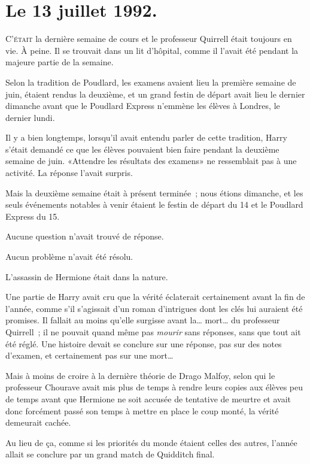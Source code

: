 
\section{Le 13 juillet 1992.}

\lettrine{C}{'était} la dernière semaine de cours et le professeur Quirrell était toujours en vie. À peine. Il se trouvait dans un lit d'hôpital, comme il l'avait été pendant la majeure partie de la semaine.

Selon la tradition de Poudlard, les examens avaient lieu la première semaine de juin, étaient rendus la deuxième, et un grand festin de départ avait lieu le dernier dimanche avant que le Poudlard Express n'emmène les élèves à Londres, le dernier lundi.

Il y a bien longtemps, lorsqu'il avait entendu parler de cette tradition, Harry s'était demandé ce que les élèves pouvaient bien faire pendant la deuxième semaine de juin. «Attendre les résultats des examens» ne ressemblait pas à une activité. La réponse l'avait surpris.

Mais la deuxième semaine était à présent terminée~; nous étions dimanche, et les seuls événements notables à venir étaient le festin de départ du 14 et le Poudlard Express du 15.

Aucune question n'avait trouvé de réponse.

Aucun problème n'avait été résolu.

L'assassin de Hermione était dans la nature.

Une partie de Harry avait cru que la vérité éclaterait certainement avant la fin de l'année, comme s'il s'agissait d'un roman d'intrigues dont les clés lui auraient été promises. Il fallait au moins qu'elle surgisse avant la… mort… du professeur Quirrell~; il ne pouvait quand même pas \emph{mourir} sans réponses, sans que tout ait été réglé. Une histoire devait se conclure sur une réponse, pas sur des notes d'examen, et certainement pas sur une mort…

Mais à moins de croire à la dernière théorie de Drago Malfoy, selon qui le professeur Chourave avait mis plus de temps à rendre leurs copies aux élèves peu de temps avant que Hermione ne soit accusée de tentative de meurtre et avait donc forcément passé son temps à mettre en place le coup monté, la vérité demeurait cachée.

Au lieu de ça, comme si les priorités du monde étaient celles des autres, l'année allait se conclure par un grand match de Quidditch final.

